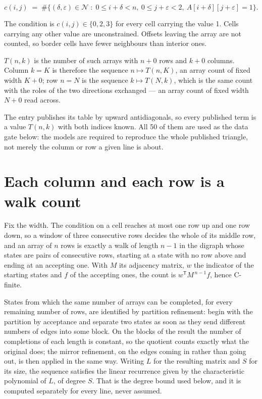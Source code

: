 \documentclass[11pt]{article}
\theoremstyle{definition}
\begin{document}
\[c(i,j) \;=\; \#\bigl\{(\delta,\varepsilon)\in\mathcal{N} \;:\; 0\le i+\delta<n,\ 0\le j+\varepsilon<2,\ A[i+\delta][j+\varepsilon] = 1\bigr\}.\]

The condition is $c(i,j) \in \{0, 2, 3\}$ for every cell carrying the value 1. Cells carrying any other value are unconstrained. Offsets leaving the array are not counted, so border cells have fewer neighbours than interior ones.

$T(n,k)$ is the number of such arrays with $n + 0$ rows and $k + 0$ columns. Column $k = K$ is therefore the sequence $n \mapsto T(n,K)$, an array count of fixed width $K + 0$; row $n = N$ is the sequence $k \mapsto T(N,k)$, which is the same count with the roles of the two directions exchanged --- an array count of fixed width $N + 0$ read across.

The entry publishes its table by upward antidiagonals, so every published term is a value $T(n,k)$ with both indices known. All 50 of them are used as the data gate below: the models are required to reproduce the whole published triangle, not merely the column or row a given line is about.

\section{Each column and each row is a walk count}

Fix the width. The condition on a cell reaches at most one row up and one row down, so a window of three consecutive rows decides the whole of its middle row, and an array of $n$ rows is exactly a walk of length $n-1$ in the digraph whose states are pairs of consecutive rows, starting at a state with no row above and ending at an accepting one. With $M$ its adjacency matrix, $w$ the indicator of the starting states and $f$ of the accepting ones, the count is $w^{\mathsf T}M^{\,n-1}f$, hence C-finite.

States from which the same number of arrays can be completed, for every remaining number of rows, are identified by partition refinement: begin with the partition by acceptance and separate two states as soon as they send different numbers of edges into some block. On the blocks of the result the number of completions of each length is constant, so the quotient counts exactly what the original does; the mirror refinement, on the edges coming in rather than going out, is then applied in the same way. Writing $L$ for the resulting matrix and $S$ for its size, the sequence satisfies the linear recurrence given by the characteristic polynomial of $L$, of degree $S$. That is the degree bound used below, and it is computed separately for every line, never assumed.
\end{document}
